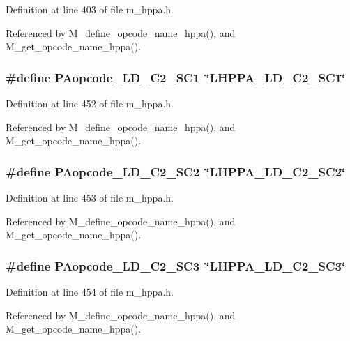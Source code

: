 Definition at line 403 of file m\_\-hppa.h.

Referenced by M\_\-define\_\-opcode\_\-name\_\-hppa(), and M\_\-get\_\-opcode\_\-name\_\-hppa().
\subsubsection{\setlength{\rightskip}{0pt plus 5cm}\#define PAopcode\_\-LD\_\-C2\_\-SC1~\char`\"{}LHPPA\_\-LD\_\-C2\_\-SC1\char`\"{}}\label{m__hppa_8h_e2ccbadab90cfbac2d8c61a3634543ad}




Definition at line 452 of file m\_\-hppa.h.

Referenced by M\_\-define\_\-opcode\_\-name\_\-hppa(), and M\_\-get\_\-opcode\_\-name\_\-hppa().
\subsubsection{\setlength{\rightskip}{0pt plus 5cm}\#define PAopcode\_\-LD\_\-C2\_\-SC2~\char`\"{}LHPPA\_\-LD\_\-C2\_\-SC2\char`\"{}}\label{m__hppa_8h_db966cf7465265e370ff3b846bab140c}




Definition at line 453 of file m\_\-hppa.h.

Referenced by M\_\-define\_\-opcode\_\-name\_\-hppa(), and M\_\-get\_\-opcode\_\-name\_\-hppa().
\subsubsection{\setlength{\rightskip}{0pt plus 5cm}\#define PAopcode\_\-LD\_\-C2\_\-SC3~\char`\"{}LHPPA\_\-LD\_\-C2\_\-SC3\char`\"{}}\label{m__hppa_8h_70e301ebe9b380bd81916aca9f52b551}




Definition at line 454 of file m\_\-hppa.h.

Referenced by M\_\-define\_\-opcode\_\-name\_\-hppa(), and M\_\-get\_\-opcode\_\-name\_\-hppa().
